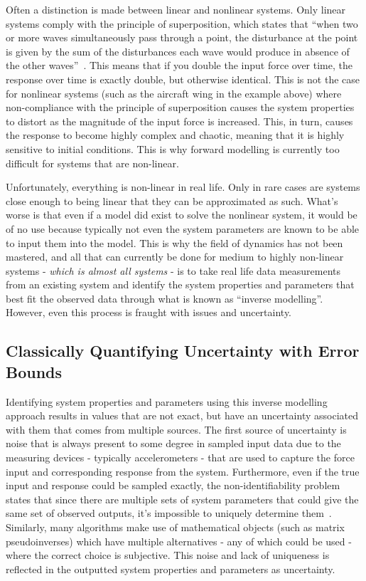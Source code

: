 \documentclass[12pt]{article}
\begin{document}

    Often a distinction is made between linear and nonlinear systems.
    Only linear systems comply with the principle of superposition, which states that ``when two or more waves simultaneously pass through a point, the disturbance at the point is given by the sum of the disturbances each wave would produce in absence of the other waves''~\cite{StudyComSuperposition}.
    This means that if you double the input force over time, the response over time is exactly double, but otherwise identical.
    This is not the case for nonlinear systems (such as the aircraft wing in the example above) where non-compliance with the principle of superposition causes the system properties to distort as the magnitude of the input force is increased.
    This, in turn, causes the response to become highly complex and chaotic, meaning that it is highly sensitive to initial conditions.
    This is why forward modelling is currently too difficult for systems that are non-linear.

    Unfortunately, everything is non-linear in real life.
    Only in rare cases are systems close enough to being linear that they can be approximated as such.
    What's worse is that even if a model did exist to solve the nonlinear system, it would be of no use because typically not even the system parameters are known to be able to input them into the model.
    This is why the field of dynamics has not been mastered, and all that can currently be done for medium to highly non-linear systems - \textit{which is almost all systems} - is to take real life data measurements from an existing system and identify the system properties and parameters that best fit the observed data through what is known as ``inverse modelling''.
    However, even this process is fraught with issues and uncertainty.

    \subsection{Classically Quantifying Uncertainty with Error Bounds}
    Identifying system properties and parameters using this inverse modelling approach results in values that are not exact, but have an uncertainty associated with them that comes from multiple sources.
    The first source of uncertainty is noise that is always present to some degree in sampled input data due to the measuring devices - typically accelerometers - that are used to capture the force input and corresponding response from the system.
    Furthermore, even if the true input and response could be sampled exactly, the non-identifiability problem states that since there are multiple sets of system parameters that could give the same set of observed outputs, it's impossible to uniquely determine them~\cite{Grabowski2023}.
    Similarly, many algorithms make use of mathematical objects (such as matrix pseudoinverses) which have multiple alternatives - any of which could be used - where the correct choice is subjective.
    This noise and lack of uniqueness is reflected in the outputted system properties and parameters as uncertainty.
\end{document}
